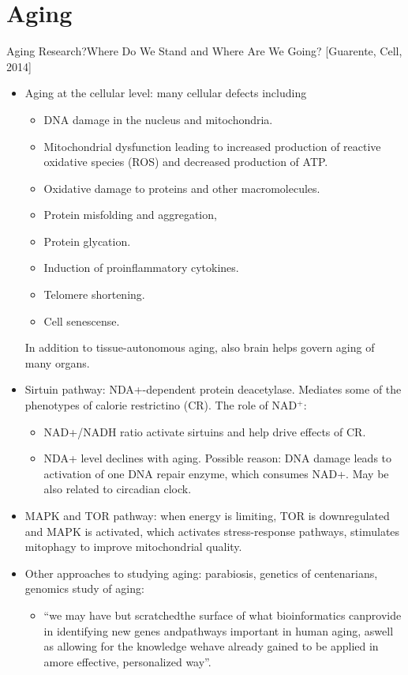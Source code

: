 \documentclass{report}
\begin{document}
\section{Aging}

Aging Research?Where Do We Stand and Where Are We Going? [Guarente, Cell, 2014]
\begin{itemize}
	\item Aging at the cellular level: many cellular defects including 
	\begin{itemize}
		\item DNA damage in the nucleus and mitochondria.
		\item Mitochondrial dysfunction leading to increased production
		of reactive oxidative species (ROS) and
		decreased production of ATP.  
		\item Oxidative damage to proteins and other macromolecules.
		\item Protein misfolding and aggregation,
		\item Protein glycation. 
		\item Induction of proinflammatory cytokines.
		\item Telomere shortening. 
		\item Cell senescense. 
	\end{itemize}
	In addition to tissue-autonomous aging, also brain helps govern aging of many organs. 
	
	\item Sirtuin pathway: NDA+-dependent protein deacetylase. Mediates some of the phenotypes of calorie restrictino (CR). The role of NAD$^+$: 
	\begin{itemize}
		\item NAD+/NADH ratio activate sirtuins and help drive effects of CR. 
		\item NDA+ level declines with aging. Possible reason: DNA damage leads to activation of one DNA repair enzyme, which consumes NAD+. May be also related to circadian clock.  
	\end{itemize}
	
	\item MAPK and TOR pathway: when energy is limiting, TOR is downregulated and MAPK is activated, which activates stress-response pathways, stimulates mitophagy to improve mitochondrial quality. 
	
	\item Other approaches to studying aging: parabiosis, genetics of centenarians, genomics study of aging: 
	\begin{itemize}
		\item ``we may have but scratchedthe surface of what bioinformatics canprovide in identifying new genes andpathways important in human aging, aswell as allowing for the knowledge wehave already gained to be applied in amore effective, personalized way''. 
		

\end{itemize}
\end{itemize}
\end{document}
